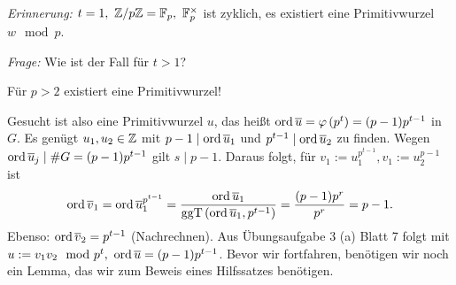 \documentclass[a4paper,DIV15,BCOR12mm]{article}
\begin{document}
\emph{Erinnerung:} $t=1,\ \MdZ/p\MdZ=\MdF_p,\ \MdF_p^{\times}$ ist
zyklich, es existiert eine Primitivwurzel $w \mod p$.

\emph{Frage:} Wie ist der Fall für $t>1$?

Für $p>2$ existiert eine Primitivwurzel!

Gesucht ist also eine Primitivwurzel $u$, das heißt $\mathop{\rm ord}\nolimits \overline
u = \varphi\left(p^t\right)=(p-1)p^{t-1}$ in $G$. Es genügt $u_1,u_2
\in \mathbb{Z}$ mit $p-1 \mid \mathop{\rm ord}\nolimits \overline u_1$ und $p^{t-1} \mid \mathop{\rm ord}\nolimits
\overline u_2$ zu finden. Wegen $\mathop{\rm ord}\nolimits \overline u_j \mid
\#G=(p-1)p^{t-1}$ gilt $s \mid p-1$. Daraus folgt, für
$v_1:=u_1^{p^{t-1}},v_1:=u_2^{p-1}$ ist
\[
\mathop{\rm ord}\nolimits \overline v_1=\mathop{\rm ord}\nolimits \overline u_1^{p^{t-1}}=\frac{\mathop{\rm ord}\nolimits \overline
u_1}{\mathop{\rm ggT}\nolimits\left(\mathop{\rm ord}\nolimits \overline u_1,p^{t-1}
\right)}=\frac{(p-1)p^r}{p^r}=p-1.
\]
Ebenso: $\mathop{\rm ord}\nolimits\overline v_2=p^{t-1}$ (Nachrechnen). Aus Übungsaufgabe
3 (a) Blatt 7 folgt mit $u:=v_1v_2 \mod p^t,\ \mathop{\rm ord}\nolimits \overline
u=(p-1)p^{t-1}$. Bevor wir fortfahren, benötigen wir noch ein Lemma,
das wir zum Beweis eines Hilfssatzes benötigen.
\end{document}
